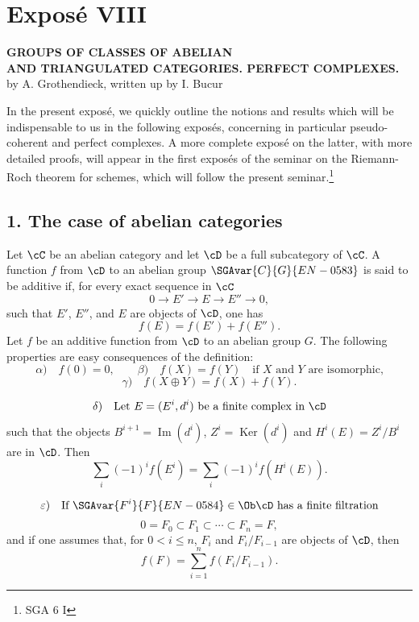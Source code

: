 \newpage
\section*{Exposé VIII}

\begin{center}
\textbf{GROUPS OF CLASSES OF ABELIAN}\\
\textbf{AND TRIANGULATED CATEGORIES. PERFECT COMPLEXES.}\\[1ex]
by A. Grothendieck, written up by I. Bucur
\end{center}

In the present exposé, we quickly outline the notions and results which will be indispensable to us in the following exposés, concerning in particular pseudo-coherent and perfect complexes. A more complete exposé on the latter, with more detailed proofs, will appear in the first exposés of the seminar on the Riemann-Roch theorem for schemes, which will follow the present seminar.\footnote{SGA 6 I}

\subsection*{1. The case of abelian categories}

Let $\cC$ be an abelian category and let $\cD$ be a full subcategory of $\cC$. A function $f$ from $\cD$ to an abelian group $\SGAvar{C}{G}{EN-0583}$ is said to be additive if, for every exact sequence in $\cC$
\[
0\longrightarrow E'\longrightarrow E\longrightarrow E''\longrightarrow 0,
\]
such that $E'$, $E''$, and $E$ are objects of $\cD$, one has
\[
f(E)=f(E')+f(E'').
\]
Let $f$ be an additive function from $\cD$ to an abelian group $G$. The following properties are easy consequences of the definition:
\[
\alpha)\quad f(0)=0,\qquad
\beta)\quad f(X)=f(Y)\quad\text{if }X\text{ and }Y\text{ are isomorphic,}
\]
\[
\gamma)\quad f(X\oplus Y)=f(X)+f(Y).
\]

\[
\delta)\quad
\text{Let }E=(E^i,d^i)\text{ be a finite complex in }\cD
\]
such that the objects $B^{i+1}=\operatorname{Im}(d^i)$, $Z^i=\operatorname{Ker}(d^i)$ and $H^i(E)=Z^i/B^i$ are in $\cD$. Then
\[
\sum_i (-1)^i f(E^i)=\sum_i (-1)^i f(H^i(E)).
\]

\[
\varepsilon)\quad
\text{If }\SGAvar{F^i}{F}{EN-0584}\in\Ob \cD\text{ has a finite filtration}
\]
\[
0=F_0\subset F_1\subset\cdots\subset F_n=F,
\]
and if one assumes that, for $0<i\le n$, $F_i$ and $F_i/F_{i-1}$ are objects of $\cD$, then
\[
f(F)=\sum_{i=1}^n f(F_i/F_{i-1}).
\]

